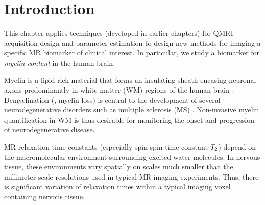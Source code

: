 
\section{Introduction}
\label{s,mwf,intro}

This chapter applies techniques
(developed in earlier chapters)
for QMRI acquisition design
and parameter estimation
to design new methods 
for imaging a specific MR biomarker
of clinical interest.
In particular,
we study a biomarker 
for \emph{myelin content} 
in the human brain.

Myelin is a lipid-rich material
that forms an insulating sheath
encasing neuronal axons 
predominantly in white matter (WM) regions
of the human brain
\cite{morell:84}.
Demyelination (\ie, myelin loss) is central
to the development 
of several neurodegenerative disorders
such as multiple sclerosis (MS)
\cite{goldenberg:12:msr}. 
Non-invasive myelin quantification in WM
is thus desirable 
for monitoring the onset and progression
of neurodegenerative disease.

MR relaxation time constants
(especially spin-spin time constant $T_2$)
depend on the macromolecular environment
surrounding excited water molecules.
In nervous tissue,
these environments vary spatially
on scales much smaller 
than the millimeter-scale resolutions
used in typical MR imaging experiments.
Thus, 
there is significant variation
of relaxation times 
within a typical imaging voxel 
containing nervous tissue.

